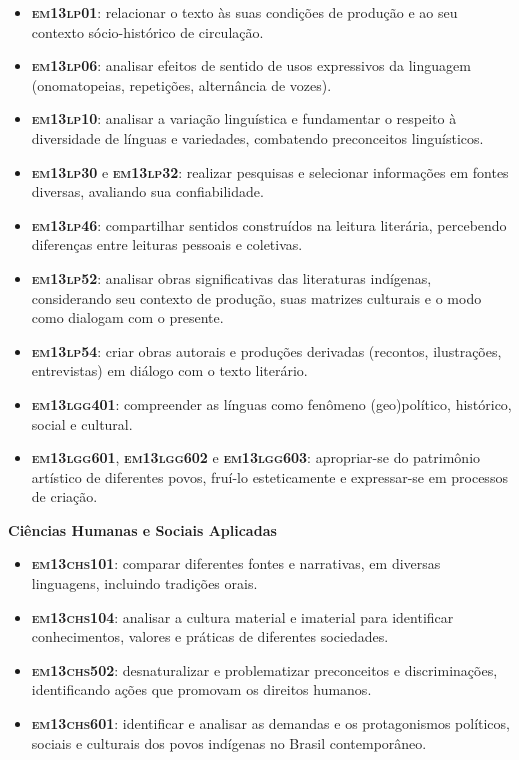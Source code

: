 \begin{itemize}
\item \textbf{\textsc{em13lp01}}: relacionar o texto às suas condições de
produção e ao seu contexto sócio-histórico de circulação.
\item \textbf{\textsc{em13lp06}}: analisar efeitos de sentido de usos expressivos
da linguagem (onomatopeias, repetições, alternância de vozes).
\item \textbf{\textsc{em13lp10}}: analisar a variação linguística e fundamentar o
respeito à diversidade de línguas e variedades, combatendo preconceitos
linguísticos.
\item \textbf{\textsc{em13lp30}} e \textbf{\textsc{em13lp32}}: realizar pesquisas e
selecionar informações em fontes diversas, avaliando sua confiabilidade.
\item \textbf{\textsc{em13lp46}}: compartilhar sentidos construídos na leitura
literária, percebendo diferenças entre leituras pessoais e coletivas.
\item \textbf{\textsc{em13lp52}}: analisar obras significativas das literaturas
indígenas, considerando seu contexto de produção, suas matrizes
culturais e o modo como dialogam com o presente.
\item \textbf{\textsc{em13lp54}}: criar obras autorais e produções derivadas
(recontos, ilustrações, entrevistas) em diálogo com o texto literário.
\item \textbf{\textsc{em13lgg401}}: compreender as línguas como fenômeno
(geo)político, histórico, social e cultural.
\item \textbf{\textsc{em13lgg601}}, \textbf{\textsc{em13lgg602}} e \textbf{\textsc{em13lgg603}}:
apropriar-se do patrimônio artístico de diferentes povos, fruí-lo
esteticamente e expressar-se em processos de criação.
\end{itemize}

\textbf{Ciências Humanas e Sociais Aplicadas}

\begin{itemize}
\item \textbf{\textsc{em13chs101}}: comparar diferentes fontes e narrativas, em
diversas linguagens, incluindo tradições orais.
\item \textbf{\textsc{em13chs104}}: analisar a cultura material e imaterial para
identificar conhecimentos, valores e práticas de diferentes sociedades.
\item \textbf{\textsc{em13chs502}}: desnaturalizar e problematizar preconceitos e
discriminações, identificando ações que promovam os direitos humanos.
\item \textbf{\textsc{em13chs601}}: identificar e analisar as demandas e os
protagonismos políticos, sociais e culturais dos povos indígenas no
Brasil contemporâneo.
\end{itemize}

